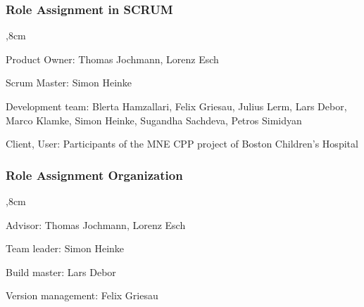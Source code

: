 \subsubsection{Role Assignment in SCRUM}

\begin{aims}
	,8cm
	\item[Product Owner:] Thomas Jochmann, Lorenz Esch
	
	\item[Scrum Master:] Simon Heinke
	
	\item[Development team:] Blerta Hamzallari, Felix Griesau, Julius Lerm, Lars Debor, Marco Klamke, Simon Heinke, Sugandha Sachdeva, Petros Simidyan
	
	\item[Client, User:] Participants of the MNE CPP project of Boston Children's Hospital
	
\end{aims}

\subsubsection{Role Assignment Organization}
\begin{aims}
	,8cm
	\item[Advisor:] Thomas Jochmann, Lorenz Esch
	
	\item[Team leader:] Simon Heinke
	
	\item[Build master:] Lars Debor
	
	\item[Version management:] Felix Griesau
	
\end{aims}

\clearpage